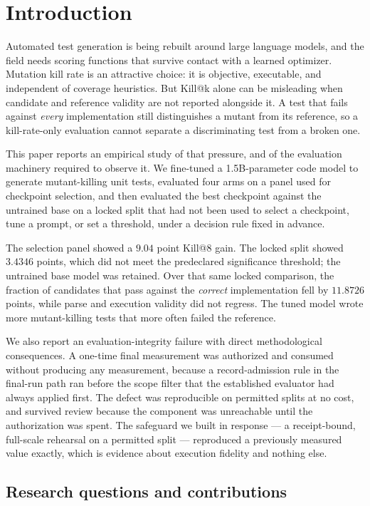 \documentclass[10pt,conference,letterpaper]{IEEEtran}
\makeatletter
\newcommand{\killk}[1]{Kill@#1}
\makeatother
\begin{document}
\section{Introduction}

Automated test generation is being rebuilt around large language models, and the
field needs scoring functions that survive contact with a learned optimizer.
Mutation kill rate is an attractive choice: it is objective, executable, and
independent of coverage heuristics. But \killk{k} alone can be misleading when
candidate and reference validity are not reported alongside it. A test that fails
against \emph{every} implementation still distinguishes a mutant from its
reference, so a kill-rate-only evaluation cannot separate a discriminating test
from a broken one.

This paper reports an empirical study of that pressure, and of the evaluation
machinery required to observe it. We fine-tuned a 1.5B-parameter code model to
generate mutant-killing unit tests, evaluated four arms on a panel used for
checkpoint selection, and then evaluated the best checkpoint against the
untrained base on a locked split that had not been used to select a checkpoint,
tune a prompt, or set a threshold, under a decision rule fixed in advance.

The selection panel showed a $9.04$ point \killk{8} gain. The locked split
showed $3.4346$ points, which did not meet the predeclared significance
threshold; the untrained base model was retained. Over that same locked
comparison, the fraction of candidates that pass against the \emph{correct}
implementation fell by $11.8726$ points, while parse and execution validity did
not regress. The tuned model wrote more mutant-killing tests that more often
failed the reference.

We also report an evaluation-integrity failure with direct methodological
consequences. A one-time final measurement was authorized and consumed without
producing any measurement, because a record-admission rule in the final-run path
ran before the scope filter that the established evaluator had always applied
first. The defect was reproducible on permitted splits at no cost, and survived
review because the component was unreachable until the authorization was spent.
The safeguard we built in response --- a receipt-bound, full-scale rehearsal on
a permitted split --- reproduced a previously measured value exactly, which is
evidence about execution fidelity and nothing else.

\subsection*{Research questions and contributions}
\end{document}
